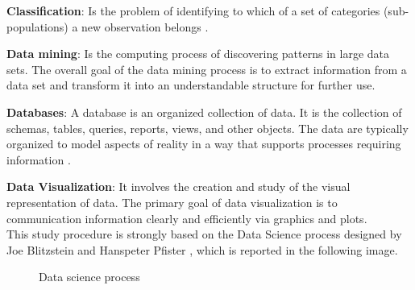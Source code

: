 \textbf{Classification}: Is the problem of identifying to which of a set of categories (sub-populations) a new observation belongs \cite{wiki:Classification}. 


\textbf{Data mining}: Is the computing process of discovering patterns in large data sets. The overall goal of the data mining process is to extract information from a data set and transform it into an understandable structure for further use. 

\textbf{Databases}: A database is an organized collection of data. It is the collection of schemas, tables, queries, reports, views, and other objects. The data are typically organized to model aspects of reality in a way that supports processes requiring information \cite{wiki:Databases}.

\textbf{Data Visualization}: It involves the creation and study of the visual representation of data. The primary goal of data visualization is to communication information clearly and efficiently via graphics and plots. \\



This study procedure is strongly based on the Data Science process designed by Joe Blitzstein and Hanspeter Pfister \cite{DataProcessFramework}, which is reported in the following image.
\begin{figure}[H]
    \centering
    \caption[Data science process]{Data science process}
    \label{fig: Data_science_process}
\end{figure}


